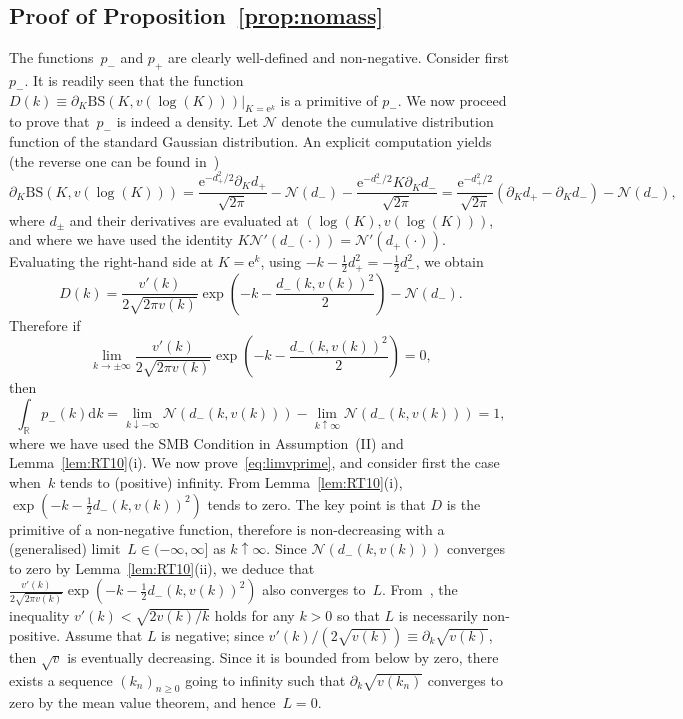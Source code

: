 \documentclass{amsart}[11pt]
\numberwithin{equation}{section}
\theoremstyle{definition}
\newcommand{\D}{\mathrm{d}}
\newcommand{\RR}{\mathbb{R}}
\newcommand{\Nn}{\mathcal{N}}
\newcommand{\BS}{\mathrm{BS}}
\newcommand{\E}{\mathrm{e}}
\begin{document}
\subsection{Proof of Proposition~\ref{prop:nomass}}\label{sec:prop:nomass}
The functions~$p_-$ and $p_+$ are clearly well-defined and non-negative. 
Consider first $p_-$. 
It is readily seen that the function  $D(k) \equiv \partial_K \BS(K, v(\log(K)))|_{K=\E^{k}}$
is a primitive of $p_-$. We now proceed to prove that~$p_-$ is indeed a density.
Let $\Nn$ denote the cumulative distribution function of the standard Gaussian distribution.
An explicit computation yields (the reverse one can be found in~\cite[Lemma 2.2]{gj})
$$
\partial_K \BS(K, v(\log(K)))
  =  \frac{\E^{-d_+^2/2}\partial_K d_+}{\sqrt{2\pi}} - \Nn (d_-)
   - \frac{\E^{-d_-^2/2}K\partial_K d_-}{\sqrt{2\pi}}
 = \frac{\E^{-d_+^2/2}}{\sqrt{2\pi}}\left(\partial_K d_+-\partial_K d_-\right)-\Nn (d_-),
$$
where $d_\pm$ and their derivatives are evaluated at $(\log(K),v(\log(K)))$, 
and where we have used the identity $K\Nn'(d_-(\cdot))=\Nn'(d_+(\cdot))$.
Evaluating the right-hand side at $K=\E^{k}$, using 
$-k-\frac{1}{2}d_+^2=-\frac{1}{2}d_-^2$, we obtain
$$
D(k) = \frac{v'(k)}{2\sqrt{2\pi v(k)}}\exp\left(-k - \frac{d_-(k,v(k))^2}{2}\right)-\Nn (d_-).
$$
Therefore if
\begin{equation}\label{eq:limvprime}
\lim_{k\to\pm\infty} \frac{v'(k)}{2\sqrt{2\pi v(k)}}\exp\left(-k - \frac{d_-(k,v(k))^2}{2}\right) = 0, 
\end{equation}
then 
$$
\int_{\RR} p_-(k) \D k = 
\lim_{k\downarrow-\infty}\Nn (d_-(k,v(k)))-\lim_{k\uparrow \infty}\Nn (d_-(k,v(k)))
=1,
$$
where we have used the SMB Condition in Assumption~(II) and Lemma~\ref{lem:RT10}(i).
We now prove~\eqref{eq:limvprime}, and consider first the case when~$k$ tends to (positive) infinity. 
From Lemma~\ref{lem:RT10}(i), $\exp\left(-k-\frac{1}{2}d_-(k,v(k))^2\right)$ tends to zero.
The key point is that $D$ is the primitive of a non-negative function, 
therefore is non-decreasing with a (generalised) limit~$L\in (-\infty,\infty]$ as
$k\uparrow\infty$. 
Since $\Nn \left(d_-(k,v(k))\right)$ converges to zero by Lemma~\ref{lem:RT10}(ii), we deduce that
$\frac{v'(k)}{2\sqrt{2 \pi v(k)}}\exp\left(-k-\frac{1}{2}d_-(k,v(k))^2\right)$ also converges to~$L$.
From~\cite[Proof of Theorem 5.3]{RT10}, 
the inequality $v'(k)<\sqrt{2 v(k)/k}$ holds for any $k>0$ so that $L$ is necessarily non-positive. 
Assume that $L$ is negative; 
since $v'(k)/(2 \sqrt{v(k)}) \equiv \partial_k \sqrt{v(k)}$, 
then $\sqrt{v}$ is eventually decreasing. 
Since it is bounded from below by zero, 
there exists a sequence $(k_n)_{n\geq 0}$ going to infinity such that $\partial_k\sqrt{v(k_n)}$ converges to zero by the mean value theorem, and hence~$L=0$.
\end{document}
